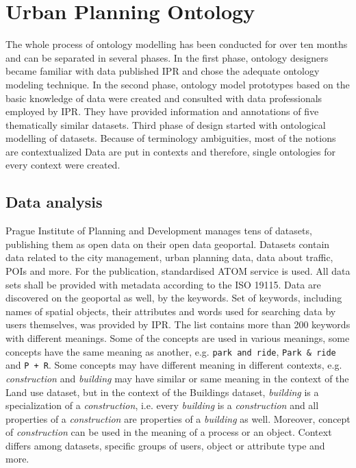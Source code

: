 \documentclass{lncs-template/llncs}
\begin{document}
\section{Urban Planning Ontology}\label{sec:ontology}

The whole process of ontology modelling has been conducted for over ten months and can be separated in several phases. In the first phase, ontology designers became familiar with data published IPR and chose the adequate ontology modeling technique. In the second phase, ontology model prototypes based on the basic knowledge of data were created and consulted with data professionals employed by IPR. They have provided information and annotations of five thematically similar datasets. Third phase of design started with ontological modelling of datasets. Because of terminology ambiguities, most of the notions are contextualized Data are put in contexts and therefore, single ontologies for every context were created.


\subsection{Data analysis}\label{sec:analysis}
Prague Institute of Planning and Development manages tens of datasets, publishing them as open data on their open data geoportal. Datasets contain data related to the city management, urban planning data, data about traffic, POIs and more. For the publication, standardised ATOM service is used. All data sets shall be provided with metadata according to the ISO 19115\cite{ISO19115}. Data are discovered on the geoportal as well, by the keywords. Set of keywords, including names of spatial objects, their attributes and words used for searching data by users themselves, was provided by IPR. The list contains more than 200 keywords with different meanings. Some of the concepts are used in various meanings, some concepts have the same meaning as another, e.g. \texttt{park and ride}, \texttt{Park \& ride} and \texttt{P + R}. Some concepts may have different meaning in different contexts, e.g. \emph{construction} and \emph{building} may have similar or same meaning in the context of the Land use dataset, but in the context of the Buildings dataset, \emph{building} is a specialization\cite{} of a \emph{construction}, i.e. every \emph{building} is a \emph{construction} and all properties of a \emph{construction} are properties of a \emph{building} as well. Moreover, concept of \emph{construction} can be used in the meaning of a process or an object. Context differs among datasets, specific groups of users, object or attribute type and more.
\end{document}
